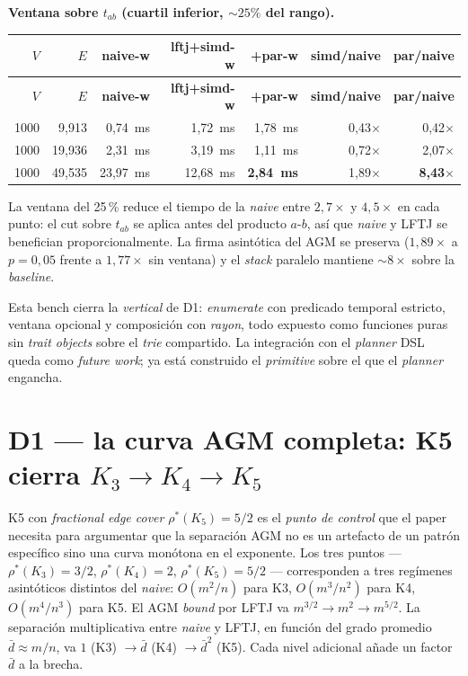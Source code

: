 \documentclass[11pt,a4paper]{report}
\newcommand{\code}[1]{\texttt{\detokenize{#1}}}
\begin{document}
\textbf{Ventana \code{[t\_lo, t\_hi)} sobre $t_{ab}$ (cuartil inferior, $\sim 25\%$ del rango).}

\begin{longtable}{rrrrrrr}
\toprule
$V$ & $E$ & \textbf{naive-w} & \textbf{lftj+simd-w} & \textbf{+par-w} & \textbf{simd/naive} & \textbf{par/naive} \\
\midrule
\endfirsthead
\toprule
$V$ & $E$ & \textbf{naive-w} & \textbf{lftj+simd-w} & \textbf{+par-w} & \textbf{simd/naive} & \textbf{par/naive} \\
\midrule
\endhead
1000 & 9{,}913  & 0{,}74~ms   & 1{,}72~ms   & 1{,}78~ms  & 0{,}43$\times$ & 0{,}42$\times$ \\
1000 & 19{,}936 & 2{,}31~ms   & 3{,}19~ms   & 1{,}11~ms  & 0{,}72$\times$ & 2{,}07$\times$ \\
1000 & 49{,}535 & 23{,}97~ms  & 12{,}68~ms  & \textbf{2{,}84~ms} & 1{,}89$\times$ & \textbf{8{,}43}$\times$ \\
\bottomrule
\end{longtable}

La ventana del 25\,\% reduce el tiempo de la \emph{naive} entre $2{,}7\times$ y $4{,}5\times$ en cada punto: el cut sobre $t_{ab}$ se aplica antes del producto $a$-$b$, así que \emph{naive} y LFTJ se benefician proporcionalmente. La firma asintótica del AGM se preserva ($1{,}89\times$ a $p=0{,}05$ frente a $1{,}77\times$ sin ventana) y el \emph{stack} paralelo mantiene $\sim 8\times$ sobre la \emph{baseline}.

Esta bench cierra la \emph{vertical} de D1: \emph{enumerate} con predicado temporal estricto, ventana opcional y composición con \emph{rayon}, todo expuesto como funciones puras sin \emph{trait objects} sobre el \emph{trie} compartido. La integración con el \emph{planner} DSL queda como \emph{future work}; ya está construido el \emph{primitive} sobre el que el \emph{planner} engancha.

\chapter{D1 --- la curva AGM completa: K5 cierra $K_3 \to K_4 \to K_5$}

K5 con \emph{fractional edge cover} $\rho^*(K_5) = 5/2$ es el \emph{punto de control} que el paper necesita para argumentar que la separación AGM no es un artefacto de un patrón específico sino una curva monótona en el exponente. Los tres puntos --- $\rho^*(K_3) = 3/2$, $\rho^*(K_4) = 2$, $\rho^*(K_5) = 5/2$ --- corresponden a tres regímenes asintóticos distintos del \emph{naive}: $O(m^2/n)$ para K3, $O(m^3/n^2)$ para K4, $O(m^4/n^3)$ para K5. El AGM \emph{bound} por LFTJ va $m^{3/2} \to m^2 \to m^{5/2}$. La separación multiplicativa entre \emph{naive} y LFTJ, en función del grado promedio $\bar d \approx m/n$, va $1$ (K3) $\to \bar d$ (K4) $\to \bar d^2$ (K5). Cada nivel adicional añade un factor $\bar d$ a la brecha.
\end{document}
